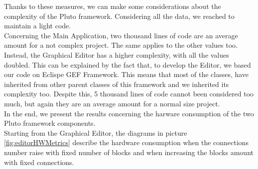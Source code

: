 Thanks to these measures, we can make some considerations about the complexity of the Pluto framework.
Considering all the data, we reached to maintain a light code.
\\
Concerning the Main Application, two thousand lines of code are an average amount for a not complex project. The same applies to the other values too.
\\
Instead, the Graphical Editor has a higher complexity, with all the values doubled. 
This can be explained by the fact that, to develop the Editor, we based our code on Eclispe GEF Framework.
This means that most of the classes, have inherited from other parent classes of this framework and we inherited its complexity too. Despite this, 5 thousand lines of code cannot been considered too much, but again they are an average amount for a normal size project.
\\

In the end, we present the results concerning the harware consumption of the two Pluto framework components.
\\
Starting from the Graphical Editor, the diagrams in picture \ref{fig:editorHWMetrics} describe the hardware consumption when the connections number raise with fixed number of blocks and when increasing the blocks amount with fixed connections.


